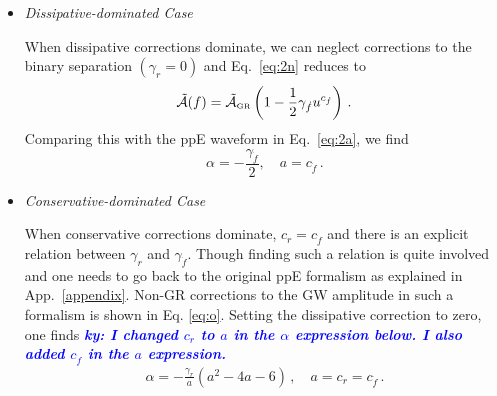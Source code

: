 \documentclass[prd,twocolumn,nofootinbib]{revtex4-1}
\newcommand{\GR}{{\mbox{\tiny GR}}}
\newcommand{\ky}[1]{\textcolor{blue}{\it{\textbf{ky: #1}}} }
\newcommand{\st}[1]{\textcolor{cyan}{\it{\textbf{st: #1}}} }
\begin{document}
\begin{itemize}

\item
\emph{Dissipative-dominated Case}

When dissipative corrections dominate, we can neglect corrections to the binary separation $(\gamma_{r} = 0)$ and Eq.~\eqref{eq:2n} reduces to
\begin{equation}
\tilde{\mathcal{A}}(f)=\tilde{\mathcal{A}}_{\GR} \left(1-\frac{1}{2}\gamma_{\dot{f}}u^{c_{\dot{f}}}\right)\,.
\end{equation}
Comparing this with the ppE waveform in Eq.~\eqref{eq:2a}, we find
\begin{equation}\label{eq:2t}
\alpha=-\frac{\gamma_{\dot{f}}}{2},\quad a=c_{\dot{f}}\,.
\end{equation}

\item
\emph{Conservative-dominated Case}

When conservative corrections dominate, $c_r = c_{\dot f}$ and there is an explicit relation between $\gamma_{r}$ and $\gamma_{\dot f}$. Though finding such a relation is quite involved and one needs to go back to the original ppE formalism as explained in App.~\ref{appendix}. Non-GR corrections to the GW amplitude in such a formalism is shown in Eq. \eqref{eq:o}. Setting the dissipative correction to zero, one finds 
\ky{I changed $c_r$ to $a$ in the $\alpha$ expression below. I also added $c_{\dot f}$ in the $a$ expression.}
\begin{align}\label{eq:2u}
\alpha=-\frac{\gamma_r}{a}(a^2-4a-6)\,, \quad a=c_r = c_{\dot f}\,.
\end{align} 


\end{itemize}
\end{document}
